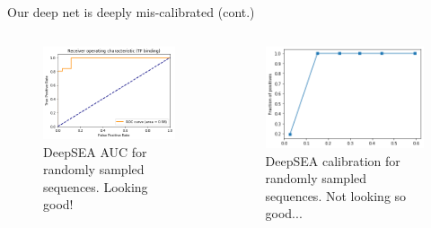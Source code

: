 \documentclass[pdf]{beamer} %
\begin{document}
\begin{frame}[t]{Our deep net is deeply mis-calibrated (cont.)}
    \begin{columns}
        \begin{figure}
            \includegraphics[scale=.4]{figures/deepsea_auc}
            \caption{DeepSEA AUC for randomly sampled sequences. Looking good!}
        \end{figure}
        \begin{figure}
            \includegraphics[scale=.4]{figures/deepsea_calibration}
            \caption{DeepSEA calibration for randomly sampled sequences. Not looking so good...}
        \end{figure}
    \end{columns}
\end{frame}
\end{document}
